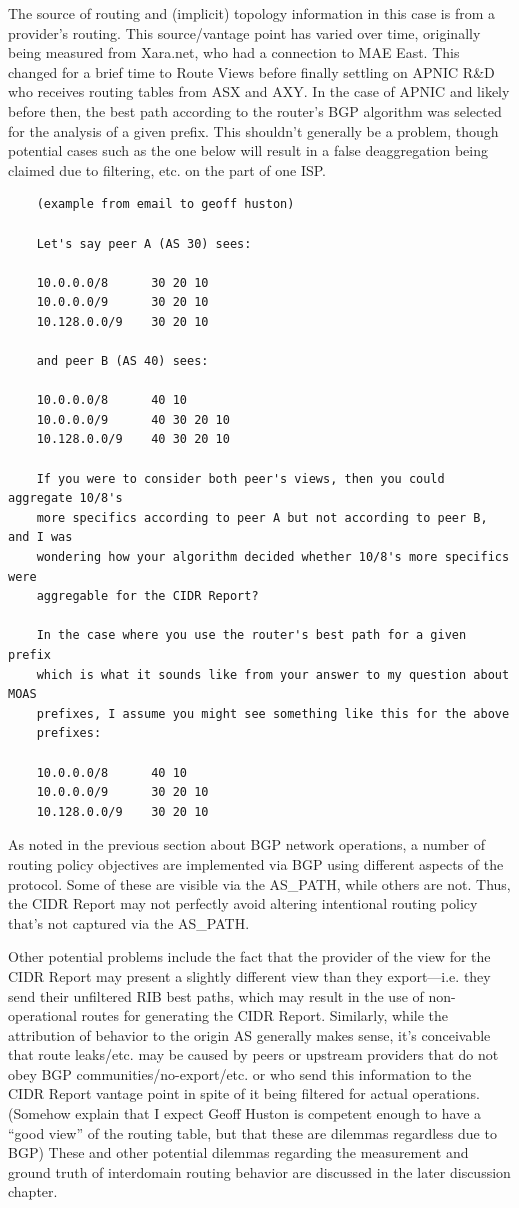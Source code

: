 The source of routing and (implicit) topology information in this case is from a provider's routing. This source/vantage point has varied over time, originally being measured from Xara.net, who had a connection to MAE East. This changed for a brief time to Route Views before finally settling on APNIC R\&D who receives routing tables from ASX and AXY. In the case of APNIC and likely before then, the best path according to the router's BGP algorithm was selected for the analysis of a given prefix. This shouldn't generally be a problem, though potential cases such as the one below will result in a false deaggregation being claimed due to filtering, etc. on the part of one ISP.

\begin{verbatim}
	(example from email to geoff huston)

	Let's say peer A (AS 30) sees:

	10.0.0.0/8      30 20 10
	10.0.0.0/9      30 20 10
	10.128.0.0/9    30 20 10

	and peer B (AS 40) sees:

	10.0.0.0/8      40 10
	10.0.0.0/9      40 30 20 10
	10.128.0.0/9    40 30 20 10

	If you were to consider both peer's views, then you could aggregate 10/8's
	more specifics according to peer A but not according to peer B, and I was
	wondering how your algorithm decided whether 10/8's more specifics were
	aggregable for the CIDR Report?

	In the case where you use the router's best path for a given prefix
	which is what it sounds like from your answer to my question about MOAS
	prefixes, I assume you might see something like this for the above
	prefixes:

	10.0.0.0/8      40 10
	10.0.0.0/9      30 20 10
	10.128.0.0/9    30 20 10
\end{verbatim}

As noted in the previous section about BGP network operations, a number of routing policy objectives are implemented via BGP using different aspects of the protocol. Some of these are visible via the AS\_PATH, while others are not. Thus, the CIDR Report may not perfectly avoid altering intentional routing policy that's not captured via the AS\_PATH.

Other potential problems include the fact that the provider of the view for the CIDR Report may present a slightly different view than they export---i.e. they send their unfiltered RIB best paths, which may result in the use of non-operational routes for generating the CIDR Report. Similarly, while the attribution of behavior to the origin AS generally makes sense, it's conceivable that route leaks/etc. may be caused by peers or upstream providers that do not obey BGP communities/no-export/etc. or who send this information to the CIDR Report vantage point in spite of it being filtered for actual operations. (Somehow explain that I expect Geoff Huston is competent enough to have a ``good view'' of the routing table, but that these are dilemmas regardless due to BGP) These and other potential dilemmas regarding the measurement and ground truth of interdomain routing behavior are discussed in the later discussion chapter.

